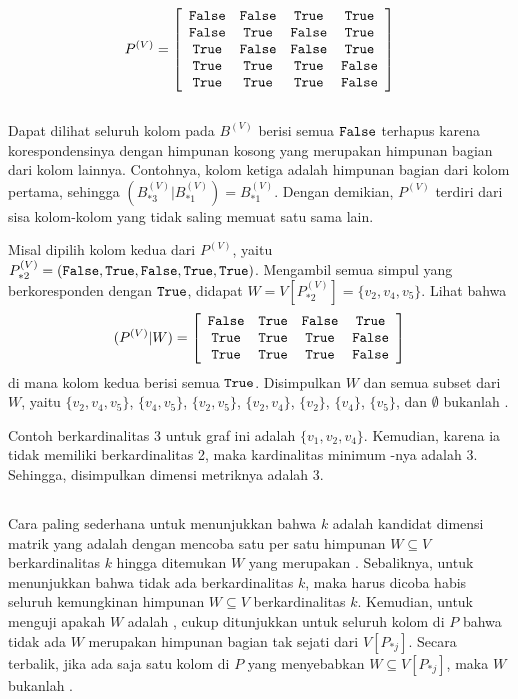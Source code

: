 \[
	P^{(V)} = \left[ \begin{array}{ccccc}
		\mathtt{False} & \mathtt{False} &  \mathtt{True} &  \mathtt{True} \\
		\mathtt{False} &  \mathtt{True} & \mathtt{False} &  \mathtt{True} \\
		 \mathtt{True} & \mathtt{False} & \mathtt{False} &  \mathtt{True} \\
		 \mathtt{True} &  \mathtt{True} &  \mathtt{True} & \mathtt{False} \\
		 \mathtt{True} &  \mathtt{True} &  \mathtt{True} & \mathtt{False} \\
	\end{array} \right]
\] \\
Dapat dilihat seluruh kolom pada \(B^{(V)}\) berisi semua \(\mathtt{False}\) terhapus karena korespondensinya dengan himpunan kosong yang merupakan himpunan bagian dari kolom lainnya. Contohnya, kolom ketiga adalah himpunan bagian dari kolom pertama, sehingga \((B^{(V)}_{*3} | B^{(V)}_{*1}) = B^{(V)}_{*1}\). Dengan demikian, \(P^{(V)}\) terdiri dari sisa kolom-kolom yang tidak saling memuat satu sama lain.

Misal dipilih kolom kedua dari \(P^{(V)}\), yaitu \(P^{(V)}_{*2} = (\mathtt{False}, \mathtt{True}, \mathtt{False}, \mathtt{True}, \mathtt{True})\). Mengambil semua simpul yang berkoresponden dengan \(\mathtt{True}\), didapat \(W = V[P^{(V)}_{*2}] = \{v_2, v_4, v_5\}\). Lihat bahwa
\[
	(P^{(V)}|W) = \left[ \begin{array}{ccccc}
		\mathtt{False} &  \mathtt{True} & \mathtt{False} &  \mathtt{True} \\
		 \mathtt{True} &  \mathtt{True} &  \mathtt{True} & \mathtt{False} \\
		 \mathtt{True} &  \mathtt{True} &  \mathtt{True} & \mathtt{False} \\
	\end{array} \right]
\]
di mana kolom kedua berisi semua \(\mathtt{True}\). Disimpulkan \(W\) dan semua subset dari \(W\), yaitu \(\{v_2, v_4, v_5\}\), \(\{v_4, v_5\}\), \(\{v_2, v_5\}\), \(\{v_2, v_4\}\), \(\{v_2\}\), \(\{v_4\}\), \(\{v_5\}\), dan \(\emptyset\) bukanlah .

Contoh  berkardinalitas 3 untuk graf ini adalah \(\{v_1, v_2, v_4\}\). Kemudian, karena ia tidak memiliki  berkardinalitas 2, maka kardinalitas minimum -nya adalah 3. Sehingga, disimpulkan dimensi metriknya adalah 3.

\subsection{}
\label{subsec:bf}

Cara paling sederhana untuk menunjukkan bahwa \(k\) adalah kandidat dimensi matrik yang  adalah dengan mencoba satu per satu himpunan \(W \subseteq V\) berkardinalitas \(k\) hingga ditemukan \(W\) yang merupakan . Sebaliknya, untuk menunjukkan bahwa tidak ada  berkardinalitas \(k\), maka harus dicoba habis seluruh kemungkinan himpunan \(W \subseteq V\) berkardinalitas \(k\). Kemudian, untuk menguji apakah \(W\) adalah , cukup ditunjukkan untuk seluruh kolom di \(P\) bahwa tidak ada \(W\) merupakan himpunan bagian tak sejati dari \(V[P_{*j}]\). Secara terbalik, jika ada saja satu kolom di \(P\) yang menyebabkan \(W \subseteq V[P_{*j}]\), maka \(W\) bukanlah .

